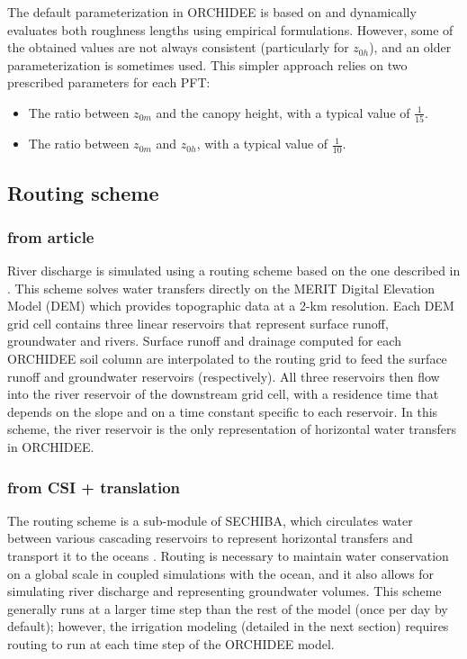 The default parameterization in ORCHIDEE is based on \citet{su_evaluation_2001} and dynamically evaluates both roughness lengths using empirical formulations. However, some of the obtained values are not always consistent (particularly for $z_{0h}$), and an older parameterization is sometimes used. This simpler approach relies on two prescribed parameters for each PFT:  
\begin{itemize}
    \item The ratio between $z_{0m}$ and the canopy height, with a typical value of $\frac{1}{15}$.
    \item The ratio between $z_{0m}$ and $z_{0h}$, with a typical value of $\frac{1}{10}$.  
\end{itemize}

\subsection{Routing scheme}
\subsubsection{from article}
River discharge is simulated using a routing scheme based on the one described in \citet{ngo-duc_validation_2007}.
This scheme solves water transfers directly on the MERIT Digital Elevation Model (DEM) \citep{yamazaki_merit_2019} which provides topographic data at a 2-km resolution. Each DEM grid cell contains three linear reservoirs that represent surface runoff, groundwater and rivers. Surface runoff and drainage computed for each ORCHIDEE soil column are interpolated to the routing grid to feed the surface runoff and groundwater reservoirs (respectively). All three reservoirs then flow into the river reservoir of the downstream grid cell, with a residence time that depends on the slope and on a time constant specific to each reservoir. 
In this scheme, the river reservoir is the only representation of horizontal water transfers in ORCHIDEE.

\subsubsection{from CSI + translation}
The routing scheme is a sub-module of SECHIBA, which circulates water between various cascading reservoirs to represent horizontal transfers and transport it to the oceans \citep{ducharne_development_2003, ngo-duc_validation_2007}. 
Routing is necessary to maintain water conservation on a global scale in coupled simulations with the ocean, and it also allows for simulating river discharge and representing groundwater volumes. 
This scheme generally runs at a larger time step than the rest of the model (once per day by default); however, the irrigation modeling (detailed in the next section) requires routing to run at each time step of the ORCHIDEE model.

